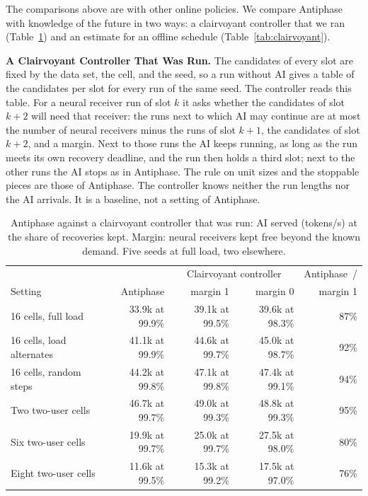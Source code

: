 \documentclass[acmsmall,screen,review,anonymous]{acmart}
\newcommand{\sys}{Antiphase\xspace}
\begin{document}
The comparisons above are with other online policies. We compare \sys with knowledge of the future in two
ways: a clairvoyant controller that we ran (Table~\ref{tab:oracle}) and an estimate for an offline schedule
(Table~\ref{tab:clairvoyant}).

\noindent\textbf{A Clairvoyant Controller That Was Run.} The candidates of every slot are fixed by the data
set, the cell, and the seed, so a run without AI gives a table of the candidates per slot for every run of
the same seed. The controller reads this table. For a neural receiver run of slot $k$ it asks whether the
candidates of slot $k+2$ will need that receiver: the runs next to which AI may continue are at most the
number of neural receivers minus the runs of slot $k+1$, the candidates of slot $k+2$, and a margin. Next to
those runs the AI keeps running, as long as the run meets its own recovery deadline, and the run then holds
a third slot; next to the other runs the AI stops as in \sys. The rule on unit sizes and the stoppable
pieces are those of \sys. The controller knows neither the run lengths nor the AI arrivals. It is a
baseline, not a setting of \sys.

\begin{table}[t]
\caption{\sys against a clairvoyant controller that was run: AI served (tokens/s) at the share of
recoveries kept. Margin: neural receivers kept free beyond the known demand. Five seeds at full load, two
elsewhere.}
\label{tab:oracle}
\footnotesize
\setlength{\tabcolsep}{4pt}
\begin{tabular}{@{}lrrrr@{}}
\toprule
 & & \multicolumn{2}{c}{Clairvoyant controller} & \sys\ / \\
Setting & \sys & margin 1 & margin 0 & margin 1 \\
\midrule
16 cells, full load & 33.9k at 99.9\% & 39.1k at 99.5\% & 39.6k at 98.3\% & 87\% \\
16 cells, load alternates & 41.1k at 99.9\% & 44.6k at 99.7\% & 45.0k at 98.7\% & 92\% \\
16 cells, random steps & 44.2k at 99.8\% & 47.1k at 99.8\% & 47.4k at 99.1\% & 94\% \\
Two two-user cells & 46.7k at 99.7\% & 49.0k at 99.3\% & 48.8k at 99.3\% & 95\% \\
Six two-user cells & 19.9k at 99.7\% & 25.0k at 99.7\% & 27.5k at 98.0\% & 80\% \\
Eight two-user cells & 11.6k at 99.5\% & 15.3k at 99.2\% & 17.5k at 97.0\% & 76\% \\
\bottomrule
\end{tabular}
\end{table}
\end{document}
